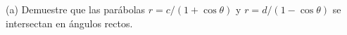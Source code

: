 \item (a) Demuestre que las parábolas $r = c/(1 + \cos\theta)$ y $r = d/(1 - \cos\theta)$ se intersectan en ángulos rectos.
